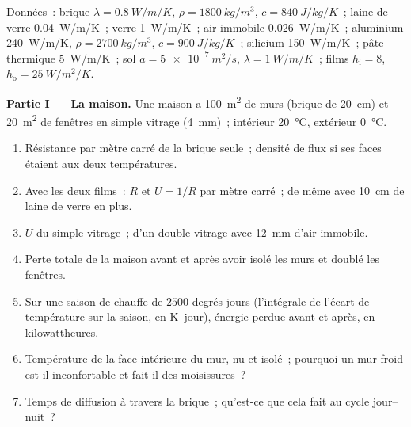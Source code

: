 \begin{problem}\label{pb:b2:heat-conduction:1}
Données~: brique $\lambda = \qty{0.8}{W/m/K}$, $\rho = \qty{1800}{kg/m^3}$, $c =
\qty{840}{J/kg/K}$~; laine de verre \qty{0.04}{W/m/K}~; verre \qty{1}{W/m/K}~; air
immobile \qty{0.026}{W/m/K}~; aluminium \qty{240}{W/m/K}, $\rho = \qty{2700}{kg/m^3}$,
$c = \qty{900}{J/kg/K}$~; silicium \qty{150}{W/m/K}~; pâte thermique
\qty{5}{W/m/K}~; sol $a = \qty{5e-7}{m^2/s}$, $\lambda = \qty{1}{W/m/K}$~;
films $h_{\text{i}} = 8$, $h_{\text{o}} = \qty{25}{W/m^2/K}$.

\textbf{Partie I --- La maison.}
Une maison a \qty{100}{m^2} de murs (brique de \qty{20}{cm}) et \qty{20}{m^2}
de fenêtres en simple vitrage (\qty{4}{mm})~; intérieur \qty{20}{\celsius},
extérieur \qty{0}{\celsius}.
\begin{enumerate}
  \item Résistance par mètre carré de la brique seule~; densité de flux
        si ses faces étaient aux deux températures.
  \item Avec les deux films~: $R$ et $U = 1/R$ par mètre carré~; de même
        avec \qty{10}{cm} de laine de verre en plus.
  \item $U$ du simple vitrage~; d'un double vitrage avec \qty{12}{mm}
        d'air immobile.
  \item Perte totale de la maison avant et après avoir isolé les murs
        et doublé les fenêtres.
  \item Sur une saison de chauffe de $2500$ degrés-jours (l'intégrale de
        l'écart de température sur la saison, en \unit{K.jour}),
        énergie perdue avant et après, en kilowattheures.
  \item Température de la face intérieure du mur, nu et isolé~;
        pourquoi un mur froid est-il inconfortable et fait-il des moisissures~?
  \item Temps de diffusion à travers la brique~; qu'est-ce que cela fait au
        cycle jour--nuit~?
\end{enumerate}


\end{problem}
